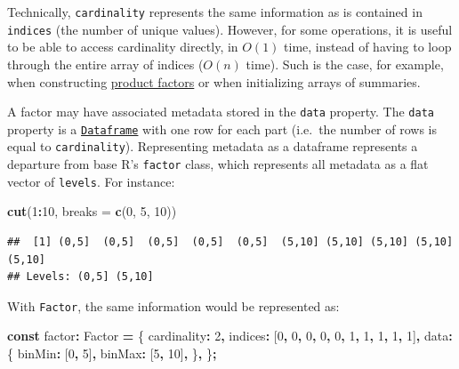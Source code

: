 \documentclass[
]{book}
\newenvironment{Shaded}{\begin{snugshade}}{\end{snugshade}}
\newcommand{\AttributeTok}[1]{\textcolor[rgb]{0.13,0.29,0.53}{#1}}
\newcommand{\DecValTok}[1]{\textcolor[rgb]{0.00,0.00,0.81}{#1}}
\newcommand{\FunctionTok}[1]{\textcolor[rgb]{0.13,0.29,0.53}{\textbf{#1}}}
\newcommand{\KeywordTok}[1]{\textcolor[rgb]{0.13,0.29,0.53}{\textbf{#1}}}
\newcommand{\NormalTok}[1]{#1}
\newcommand{\OperatorTok}[1]{\textcolor[rgb]{0.81,0.36,0.00}{\textbf{#1}}}
\newcommand{\SpecialCharTok}[1]{\textcolor[rgb]{0.81,0.36,0.00}{\textbf{#1}}}
\theoremstyle{definition}
\theoremstyle{definition}
\theoremstyle{definition}
\theoremstyle{definition}
\theoremstyle{remark}
\begin{document}
Technically, \texttt{cardinality} represents the same information as is contained in \texttt{indices} (the number of unique values). However, for some operations, it is useful to be able to access cardinality directly, in \(O(1)\) time, instead of having to loop through the entire array of indices (\(O(n)\) time). Such is the case, for example, when constructing \hyperref[Productux5cux2520factors]{product factors} or when initializing arrays of summaries.

A factor may have associated metadata stored in the \texttt{data} property. The \texttt{data} property is a \hyperref[Dataframe]{\texttt{Dataframe}} with one row for each part (i.e.~the number of rows is equal to \texttt{cardinality}). Representing metadata as a dataframe represents a departure from base R's \texttt{factor} class, which represents all metadata as a flat vector of \texttt{levels}. For instance:

\begin{Shaded}
\begin{Highlighting}[]
\FunctionTok{cut}\NormalTok{(}\DecValTok{1}\SpecialCharTok{:}\DecValTok{10}\NormalTok{, }\AttributeTok{breaks =} \FunctionTok{c}\NormalTok{(}\DecValTok{0}\NormalTok{, }\DecValTok{5}\NormalTok{, }\DecValTok{10}\NormalTok{))}
\end{Highlighting}
\end{Shaded}

\begin{verbatim}
##  [1] (0,5]  (0,5]  (0,5]  (0,5]  (0,5]  (5,10] (5,10] (5,10] (5,10] (5,10]
## Levels: (0,5] (5,10]
\end{verbatim}

With \texttt{Factor}, the same information would be represented as:

\begin{Shaded}
\begin{Highlighting}[]
\KeywordTok{const}\NormalTok{ factor}\OperatorTok{:}\NormalTok{ Factor }\OperatorTok{=}\NormalTok{ \{}
\NormalTok{  cardinality}\OperatorTok{:} \DecValTok{2}\OperatorTok{,}
\NormalTok{  indices}\OperatorTok{:}\NormalTok{ [}\DecValTok{0}\OperatorTok{,} \DecValTok{0}\OperatorTok{,} \DecValTok{0}\OperatorTok{,} \DecValTok{0}\OperatorTok{,} \DecValTok{0}\OperatorTok{,} \DecValTok{1}\OperatorTok{,} \DecValTok{1}\OperatorTok{,} \DecValTok{1}\OperatorTok{,} \DecValTok{1}\OperatorTok{,} \DecValTok{1}\NormalTok{]}\OperatorTok{,}
\NormalTok{  data}\OperatorTok{:}\NormalTok{ \{}
\NormalTok{    binMin}\OperatorTok{:}\NormalTok{ [}\DecValTok{0}\OperatorTok{,} \DecValTok{5}\NormalTok{]}\OperatorTok{,}
\NormalTok{    binMax}\OperatorTok{:}\NormalTok{ [}\DecValTok{5}\OperatorTok{,} \DecValTok{10}\NormalTok{]}\OperatorTok{,}
\NormalTok{  \}}\OperatorTok{,}
\NormalTok{\}}\OperatorTok{;}
\end{Highlighting}
\end{Shaded}
\end{document}
